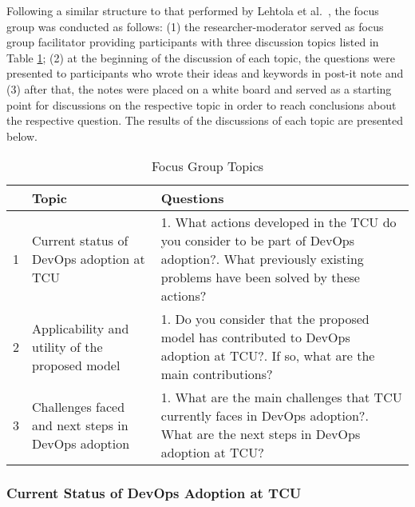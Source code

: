 {Following a similar structure to that performed by Lehtola et al.~\cite{requirementes_priorization_in_practice},
the focus group was conducted as follows: (1) the researcher-moderator served as
focus group facilitator providing participants with three discussion topics
listed in Table \ref{table_topics}; (2) at the beginning of the discussion of each topic, the
questions were presented to participants who wrote their ideas and keywords in
post-it note and (3) after that, the notes were placed on a white board and served
as a starting point for discussions on the respective topic in order to reach
conclusions about the respective question. The results of the discussions of
each topic are presented below.

\begin{table}[hb!]
\centering
\label{table_topics}
\begin{tabular}{|p{0.2cm}|p{3.4cm}|p{3.8cm}|} \hline
& \textbf{Topic} & \textbf{Questions} \\ \hline

1 & Current status of DevOps adoption at TCU &
1. What actions developed in the TCU do you consider to be part of DevOps adoption?\newline\newline
2. What previously existing problems have been solved by these actions? \\ \hline

2 & Applicability and utility of the proposed model &
1. Do you consider that the proposed model has contributed to DevOps adoption at TCU?\newline\newline
2. If so, what are the main contributions? \\ \hline

3 & Challenges faced and next steps in DevOps adoption &
1. What are the main challenges that TCU currently faces in DevOps adoption?\newline\newline
2. What are the next steps in DevOps adoption at TCU?\\ \hline

\end{tabular}
\caption{Focus Group Topics}
\end{table}
}

\subsubsection{Current Status of DevOps Adoption at TCU}

